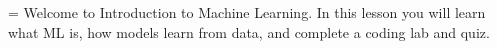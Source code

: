 \overviewmarkdown={
Welcome to Introduction to Machine Learning.
In this lesson you will learn what ML is, how models learn from data,
and complete a coding lab and quiz.
}
